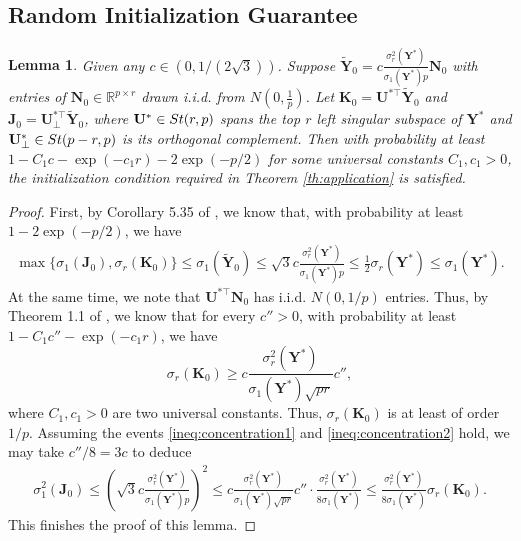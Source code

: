 \documentclass[11pt]{article}
\newtheorem{Lemma}{Lemma}
\newcommand{\bbR}{\mathbb{R}}
\newcommand{\0}{{\mathbf{0}}}
\newcommand{\1}{{\mathbf{1}}}
\newcommand{\U}{{\mathbf{U}}}
\newcommand{\K}{{\mathbf{K}}}
\newcommand{\J}{{\mathbf{J}}}
\newcommand{\Y}{{\mathbf{Y}}}
\newcommand{\st}{{\rm St}}
\begin{document}
{\subsection{Random Initialization Guarantee} \label{sec:random-initialization}
\begin{Lemma}
\label{lem:RandomIntial}
	Given any $c \in (0,1/(2\sqrt{3}))$. Suppose $\widetilde{\Y}_0 = c \frac{\sigma_r^2(\Y^*)}{\sigma_1(\Y^*) p} \mathbf{N}_0$ with entries of $\mathbf{N}_0 \in \bbR^{p \times r}$ drawn i.i.d. from $N( 0, \frac{1}{p} )$. Let $\K_0 = \U^{*\top } \widetilde{\Y}_0$ and $\J_0 = \U^{*\top }_{\perp} \widetilde{\Y}_0$, where $\U^* \in \st(r,p)$ spans the top $r$ left singular subspace of $\Y^*$ and $\U^*_{\perp}\in \st(p-r,p)$ is its orthogonal complement. Then with probability at least $1- C_1 c - \exp(-c_1 r) - 2\exp(-p/2)$ for some universal constants $C_1, c_1 > 0$, the initialization condition required in Theorem \ref{th:application} is satisfied.
\end{Lemma}
\begin{proof}
	First, by Corollary 5.35 of \cite{vershynin2010introduction}, we know that, with probability at least $1 - 2 \exp(-p/2)$, we have 
	\begin{equation} \label{ineq:concentration1}
		\begin{split}
			\max\{\sigma_1(\J_0), \sigma_r(\K_0) \} \leq \sigma_1(\widetilde{\Y}_0) \leq  \sqrt{3} c \frac{\sigma_r^2(\Y^*)}{\sigma_1(\Y^*) p} \leq \frac{1}{2} \sigma_r(\Y^*) \leq \sigma_1(\Y^*).
		\end{split}
	\end{equation} At the same time, we note that $\U^{*\top } \mathbf{N}_0$ has i.i.d. $N(0,1/p)$ entries. Thus, by Theorem 1.1 of \cite{rudelson2009smallest}, we know that for every $c'' > 0$, with probability at least $1 - C_1c'' - \exp(-c_1r) $, we have 
	\begin{equation} \label{ineq:concentration2}
		\sigma_r(\K_0) \geq  c\frac{\sigma_r^2(\Y^*)}{\sigma_1(\Y^*) \sqrt{pr}} c'',
	\end{equation} where $C_1,c_1 > 0$ are two universal constants. Thus, $\sigma_r(\K_0) $ is at least of order $1/p$. Assuming the events \eqref{ineq:concentration1} and \eqref{ineq:concentration2} hold, we may take $c'' /8 = 3 c$ to deduce
\begin{equation*}
	\begin{split}
		\sigma^2_1(\J_0) \leq \left(  \sqrt{3} c \frac{\sigma_r^2(\Y^*)}{\sigma_1(\Y^*) p}  \right)^2 \leq  c\frac{\sigma_r^2(\Y^*)}{\sigma_1(\Y^*) \sqrt{pr}} c'' \cdot \frac{\sigma^2_r(\Y^*)}{8 \sigma_1(\Y^*)}\leq  \frac{\sigma^2_r(\Y^*)}{8 \sigma_1(\Y^*)} \sigma_r(\K_0).
	\end{split}
\end{equation*} This finishes the proof of this lemma.
\end{proof}

}
\end{document}
